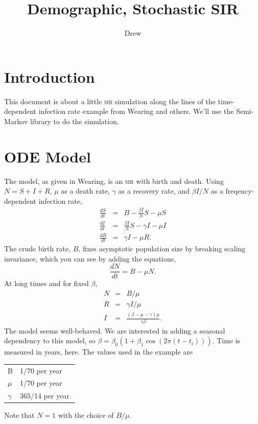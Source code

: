 \documentclass{article}
\title{Demographic, Stochastic SIR}
\author{Drew}
\newcommand{\sir}{\textsc{sir}\xspace}
\begin{document}
\maketitle

\section{Introduction}
This document is about a little \sir simulation along the lines of the
time-dependent infection rate example from Wearing and others\cite{Wearing2012}.
We'll use the Semi-Markov library\cite{SemiMarkov2014} to do the simulation.

\section{ODE Model}
The model, as given in Wearing, is an \sir with birth and death.
Using $N=S+I+R$, $\mu$ as a death rate, $\gamma$ as a recovery rate,
and $\beta I/N$ as a freqency-dependent infection rate,
\begin{eqnarray}
  \frac{dS}{dt}&=& B - \frac{\beta I}{N}S-\mu S \\
  \frac{dI}{dt}&=& \frac{\beta I}{N}S-\gamma I-\mu I \\
  \frac{dR}{dt}&=& \gamma I - \mu R.
\end{eqnarray}
The crude birth rate, $B$, fixes asymptotic population size by breaking
scaling invariance, which you can see by adding the equations,
\begin{equation}
  \frac{dN}{dt}=B-\mu N.
\end{equation}
At long times and for fixed $\beta$,
\begin{eqnarray}
  N & = & B/\mu \\
  R & = & \gamma I/\mu \\
  I & = & \frac{(\beta-\mu-\gamma)\mu}{\gamma\beta}.
\end{eqnarray}
The model seems well-behaved. We are interested in adding a seasonal
dependency to this model, so $\beta=\beta_0(1+\beta_1 \cos(2\pi (t-t_i))).$
Time is measured in years, here. The values used in the example
are
\begin{tabular}{ll}
B & 1/70 per year \\
$\mu$ & 1/70 per year \\
$\gamma$ & 365/14 per year.
\end{tabular}
Note that $N=1$ with the choice of $B/\mu$.
\end{document}
